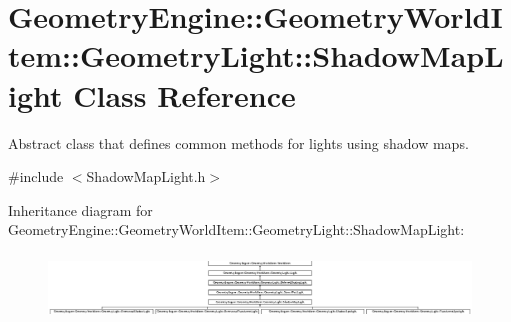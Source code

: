\hypertarget{class_geometry_engine_1_1_geometry_world_item_1_1_geometry_light_1_1_shadow_map_light}{}\section{Geometry\+Engine\+::Geometry\+World\+Item\+::Geometry\+Light\+::Shadow\+Map\+Light Class Reference}
\label{class_geometry_engine_1_1_geometry_world_item_1_1_geometry_light_1_1_shadow_map_light}


Abstract class that defines common methods for lights using shadow maps.  




{\ttfamily \#include $<$Shadow\+Map\+Light.\+h$>$}

Inheritance diagram for Geometry\+Engine\+::Geometry\+World\+Item\+::Geometry\+Light\+::Shadow\+Map\+Light\+:\begin{figure}[H]
\begin{center}
\leavevmode
\includegraphics[height=1.768421cm]{class_geometry_engine_1_1_geometry_world_item_1_1_geometry_light_1_1_shadow_map_light}
\end{center}
\end{figure}
